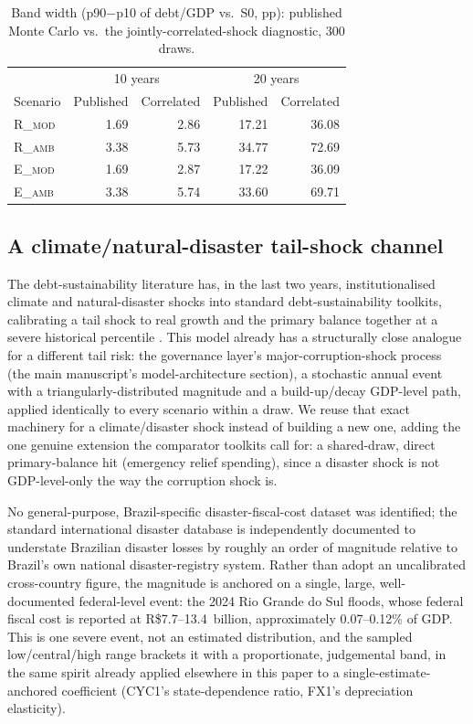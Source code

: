 \documentclass[11pt,a4paper]{article}
\begin{document}
\begin{table}[htbp]
\centering\small
\caption{Band width (p90$-$p10 of debt/GDP vs.\ \textsc{S0}, pp): published Monte Carlo vs.\ the jointly-correlated-shock diagnostic, 300 draws.}
\label{tab:cor1}
\begin{tabular}{lrrrr}
\toprule
 & \multicolumn{2}{c}{10 years} & \multicolumn{2}{c}{20 years} \\
Scenario & Published & Correlated & Published & Correlated \\
\midrule
\textsc{R\_mod} & 1.69 & 2.86 & 17.21 & 36.08 \\
\textsc{R\_amb} & 3.38 & 5.73 & 34.77 & 72.69 \\
\textsc{E\_mod} & 1.69 & 2.87 & 17.22 & 36.09 \\
\textsc{E\_amb} & 3.38 & 5.74 & 33.60 & 69.71 \\
\bottomrule
\end{tabular}
\end{table}

\subsection{A climate/natural-disaster tail-shock channel}
\label{sec:dis1}

The debt-sustainability literature has, in the last two years, institutionalised climate and natural-disaster shocks into standard debt-sustainability toolkits, calibrating a tail shock to real growth and the primary balance together at a severe historical percentile \citep{draganicetal2025}. This model already has a structurally close analogue for a different tail risk: the governance layer's major-corruption-shock process (the main manuscript's model-architecture section), a stochastic annual event with a triangularly-distributed magnitude and a build-up/decay GDP-level path, applied identically to every scenario within a draw. We reuse that exact machinery for a climate/disaster shock instead of building a new one, adding the one genuine extension the comparator toolkits call for: a shared-draw, direct primary-balance hit (emergency relief spending), since a disaster shock is not GDP-level-only the way the corruption shock is.

No general-purpose, Brazil-specific disaster-fiscal-cost dataset was identified; the standard international disaster database is independently documented to understate Brazilian disaster losses by roughly an order of magnitude relative to Brazil's own national disaster-registry system. Rather than adopt an uncalibrated cross-country figure, the magnitude is anchored on a single, large, well-documented federal-level event: the 2024 Rio Grande do Sul floods, whose federal fiscal cost is reported at R\$7.7--13.4~billion, approximately 0.07--0.12\% of GDP. This is one severe event, not an estimated distribution, and the sampled low/central/high range brackets it with a proportionate, judgemental band, in the same spirit already applied elsewhere in this paper to a single-estimate-anchored coefficient (CYC1's state-dependence ratio, FX1's depreciation elasticity).
\end{document}
